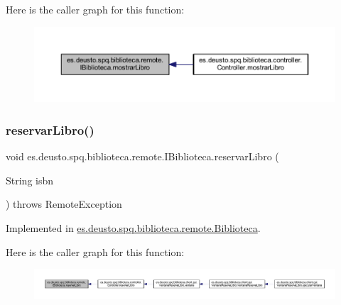 Here is the caller graph for this function\+:
\nopagebreak
\begin{figure}[H]
\begin{center}
\leavevmode
\includegraphics[width=350pt]{interfacees_1_1deusto_1_1spq_1_1biblioteca_1_1remote_1_1_i_biblioteca_a9a4d21325f41bc582e7e792e0ae40857_icgraph}
\end{center}
\end{figure}
\mbox{\label{interfacees_1_1deusto_1_1spq_1_1biblioteca_1_1remote_1_1_i_biblioteca_af8c7a0e5361bfac62c0b8804d9112b51}} 
\subsubsection{\texorpdfstring{reservar\+Libro()}{reservarLibro()}}
{\footnotesize\ttfamily void es.\+deusto.\+spq.\+biblioteca.\+remote.\+I\+Biblioteca.\+reservar\+Libro (\begin{DoxyParamCaption}\item[{String}]{isbn }\end{DoxyParamCaption}) throws Remote\+Exception}



Implemented in \mbox{\hyperlink{classes_1_1deusto_1_1spq_1_1biblioteca_1_1remote_1_1_biblioteca_aabb7d3ecb5206da47fc6c4fa315e4c6e}{es.\+deusto.\+spq.\+biblioteca.\+remote.\+Biblioteca}}.

Here is the caller graph for this function\+:
\nopagebreak
\begin{figure}[H]
\begin{center}
\leavevmode
\includegraphics[width=350pt]{interfacees_1_1deusto_1_1spq_1_1biblioteca_1_1remote_1_1_i_biblioteca_af8c7a0e5361bfac62c0b8804d9112b51_icgraph}
\end{center}
\end{figure}
\mbox{\label{interfacees_1_1deusto_1_1spq_1_1biblioteca_1_1remote_1_1_i_biblioteca_a7a9df6fad07fe2cfe50c261b5e048365}} 
